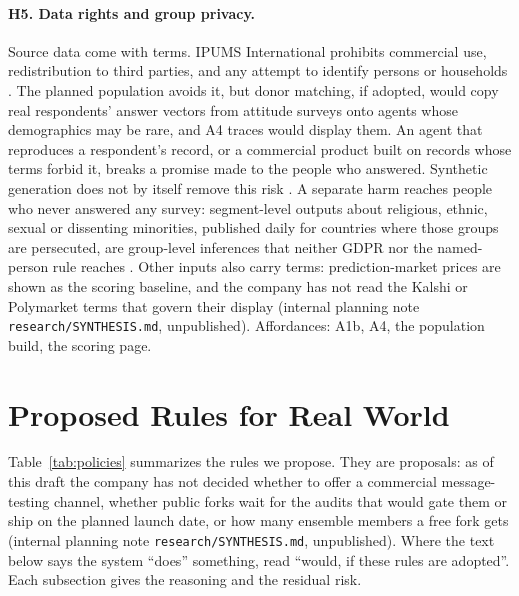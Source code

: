 \documentclass[11pt]{article}
\newcommand{\internal}[1]{internal planning note \nolinkurl{#1}, unpublished}
\begin{document}
\paragraph{H5. Data rights and group privacy.} Source data come with terms. IPUMS International prohibits commercial use, redistribution to third parties, and any attempt to identify persons or households \citep{ipums_intl_terms}. The planned population avoids it, but donor matching, if adopted, would copy real respondents' answer vectors from attitude surveys onto agents whose demographics may be rare, and A4 traces would display them. An agent that reproduces a respondent's record, or a commercial product built on records whose terms forbid it, breaks a promise made to the people who answered. Synthetic generation does not by itself remove this risk \citep{stadler2022groundhog,rocher2019reidentification}. A separate harm reaches people who never answered any survey: segment-level outputs about religious, ethnic, sexual or dissenting minorities, published daily for countries where those groups are persecuted, are group-level inferences that neither GDPR nor the named-person rule reaches \citep{taylor2017group}. Other inputs also carry terms: prediction-market prices are shown as the scoring baseline, and the company has not read the Kalshi or Polymarket terms that govern their display (\internal{research/SYNTHESIS.md}). Affordances: A1b, A4, the population build, the scoring page.

\section{Proposed Rules for Real World}
\label{sec:policies}

Table~\ref{tab:policies} summarizes the rules we propose. They are proposals: as of this draft the company has not decided whether to offer a commercial message-testing channel, whether public forks wait for the audits that would gate them or ship on the planned launch date, or how many ensemble members a free fork gets (\internal{research/SYNTHESIS.md}). Where the text below says the system ``does'' something, read ``would, if these rules are adopted''. Each subsection gives the reasoning and the residual risk.
\end{document}
